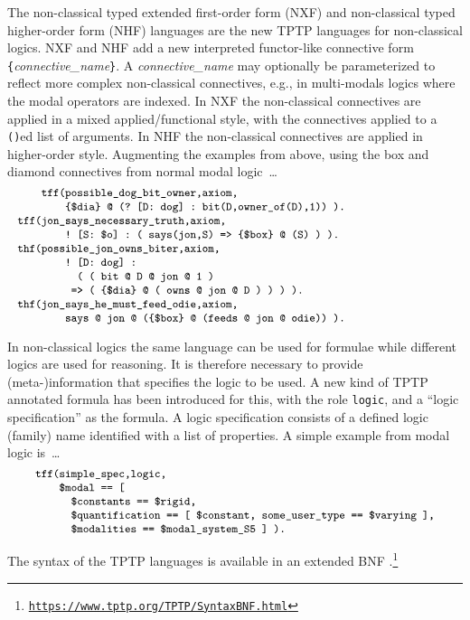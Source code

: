 \documentclass[runningheads]{llncs}
\begin{document}
The non-classical typed extended first-order form (NXF) and non-classical typed higher-order 
form (NHF) languages are the new TPTP languages for non-classical logics.
NXF and NHF add a new interpreted functor-like connective form
{\tt \verb|{|}{\em connective\_name}{\tt \verb|}|}.
A {\em connective\_name} may optionally be parameterized to reflect more complex 
non-classical connectives, e.g., in multi-modals logics where the modal operators are indexed.
In NXF the non-classical connectives are applied in a mixed applied/functional style, with the 
connectives applied to a {\tt ()}ed list of arguments.
In NHF the non-classical connectives are applied in higher-order style.
Augmenting the examples from above, using the box and diamond connectives from 
normal modal logic~\ldots 
\[
\begin{minipage}{\textwidth}
\small
\begin{verbatim}
    tff(possible_dog_bit_owner,axiom,
        {$dia} @ (? [D: dog] : bit(D,owner_of(D),1)) ).

    tff(jon_says_necessary_truth,axiom,
        ! [S: $o] : ( says(jon,S) => {$box} @ (S) ) ).

    thf(possible_jon_owns_biter,axiom,
        ! [D: dog] :
          ( ( bit @ D @ jon @ 1 )
         => ( {$dia} @ ( owns @ jon @ D ) ) ) ).
         
    thf(jon_says_he_must_feed_odie,axiom,
        says @ jon @ ({$box} @ (feeds @ jon @ odie)) ).
\end{verbatim}
\end{minipage}
\]

In non-classical logics the same language can be used for formulae while different logics are 
used for reasoning.
It is therefore necessary to provide \mbox{(meta-)}information that specifies the
logic to be used.
A new kind of TPTP annotated formula has been introduced for this, with the role \texttt{logic},
and a ``logic specification'' as the formula.
A logic specification consists of a defined logic (family) name identified with a list of 
properties.
A simple example from modal logic is~\ldots
\[
\begin{minipage}{\textwidth}
\small
\begin{verbatim}
   tff(simple_spec,logic, 
       $modal == [
         $constants == $rigid,
         $quantification == [ $constant, some_user_type == $varying ],
         $modalities == $modal_system_S5 ] ).
\end{verbatim}
\end{minipage}
\]

The syntax of the TPTP languages is available in an extended BNF \cite{VS06}.\footnote{%
\label{footnote:tptp}
\href{https://www.tptp.org/TPTP/SyntaxBNF.html}{\tt https://www.tptp.org/TPTP/SyntaxBNF.html}}



\end{document}
